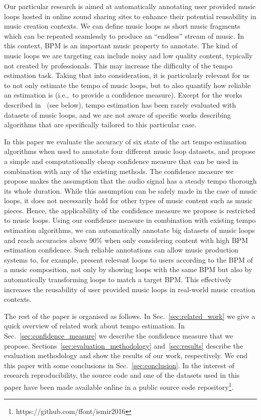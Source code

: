 \documentclass{article}
\begin{document}
Our particular research is aimed at automatically annotating user provided music loops hosted in online sound sharing sites to enhance their potential reusability in music creation contexts.
We can define music loops as short music fragments which can be repeated seamlessly to produce an ``endless'' stream of music. 
In this context, BPM is an important music property to annotate.
The kind of music loops we are targeting can include noisy and low quality content, typically not created by professionals. 
This may increase the difficulty of the tempo estimation task. 
Taking that into consideration, it is particularly relevant for us to not only estimate the tempo of music loops, but to also quantify how reliable an estimation is (i.e.,~to provide a confidence measure). 
Except for the works described in~\cite{Gouyon2006,Oliveira2010} (see below), tempo estimation has been rarely evaluated with datasets of music loops, and we are not aware of specific works describing algorithms that are specifically tailored to this particular case.

In this paper we evaluate the accuracy of six state of the art tempo estimation algorithms when used to annotate four different music loop datasets, and propose a simple and computationally cheap confidence measure that can be used in combination with any of the existing methods. 
The confidence measure we propose makes the assumption that the audio signal has a steady tempo thorough its whole duration. 
While this assumption can be safely made in the case of music loops, it does not necessarily hold for other types of music content such as music pieces.
Hence, the applicability of the confidence measure we propose is restricted to music loops.
Using our confidence measure in combination with existing tempo estimation algorithms, we can automatically annotate big datasets of music loops and reach accuracies above 90\% when only considering content with high BPM estimation confidence. 
Such reliable annotations can allow music production systems to, for example, present relevant loops to users according to the BPM of a music composition, not only by showing loops with the same BPM but also by automatically transforming loops to match a target BPM. This effectively increases the reusability of user provided music loops in real-world music creation contexts. 

The rest of the paper is organised as follows. In Sec.~\ref{sec:related_work} we give a quick overview of related work about tempo estimation.
In Sec.~\ref{sec:confidence_measure} we describe the confidence measure that we propose. Sections~\ref{sec:evaluation_methodology} and~\ref{sec:results} describe the evaluation methodology and show the results of our work, respectively. We end this paper with some conclusions in Sec.~\ref{sec:conclusion}.
In the interest of research reproducibility, the source code and one of the datasets used in this paper have been made available online in a public source code repository\footnote{https://github.com/ffont/ismir2016}.
\end{document}
